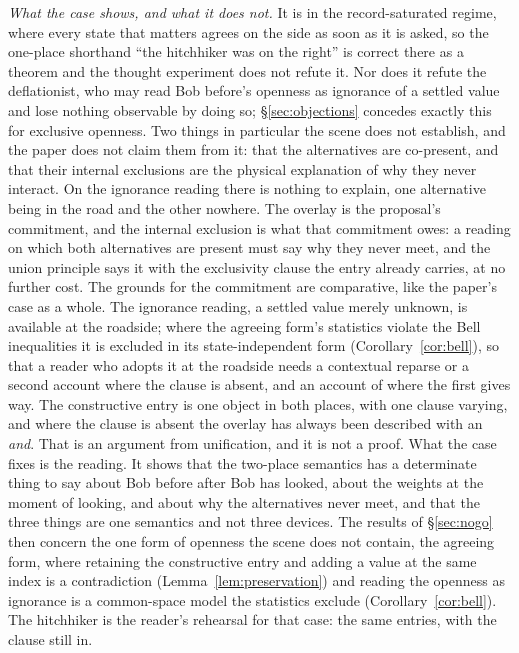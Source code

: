 \textit{What the case shows, and what it does not.} It is in the record-saturated regime, where every state that matters agrees on the side as soon as it is asked, so the one-place shorthand ``the hitchhiker was on the right'' is correct there as a theorem and the thought experiment does not refute it. Nor does it refute the deflationist, who may read Bob before's openness as ignorance of a settled value and lose nothing observable by doing so; \S\ref{sec:objections} concedes exactly this for exclusive openness. Two things in particular the scene does not establish, and the paper does not claim them from it: that the alternatives are co-present, and that their internal exclusions are the physical explanation of why they never interact. On the ignorance reading there is nothing to explain, one alternative being in the road and the other nowhere. The overlay is the proposal's commitment, and the internal exclusion is what that commitment owes: a reading on which both alternatives are present must say why they never meet, and the union principle says it with the exclusivity clause the entry already carries, at no further cost. The grounds for the commitment are comparative, like the paper's case as a whole. The ignorance reading, a settled value merely unknown, is available at the roadside; where the agreeing form's statistics violate the Bell inequalities it is excluded in its state-independent form (Corollary~\ref{cor:bell}), so that a reader who adopts it at the roadside needs a contextual reparse or a second account where the clause is absent, and an account of where the first gives way. The constructive entry is one object in both places, with one clause varying, and where the clause is absent the overlay has always been described with an \emph{and}. That is an argument from unification, and it is not a proof. What the case fixes is the reading. It shows that the two-place semantics has a determinate thing to say about Bob before after Bob has looked, about the weights at the moment of looking, and about why the alternatives never meet, and that the three things are one semantics and not three devices. The results of \S\ref{sec:nogo} then concern the one form of openness the scene does not contain, the agreeing form, where retaining the constructive entry and adding a value at the same index is a contradiction (Lemma~\ref{lem:preservation}) and reading the openness as ignorance is a common-space model the statistics exclude (Corollary~\ref{cor:bell}). The hitchhiker is the reader's rehearsal for that case: the same entries, with the clause still in.
